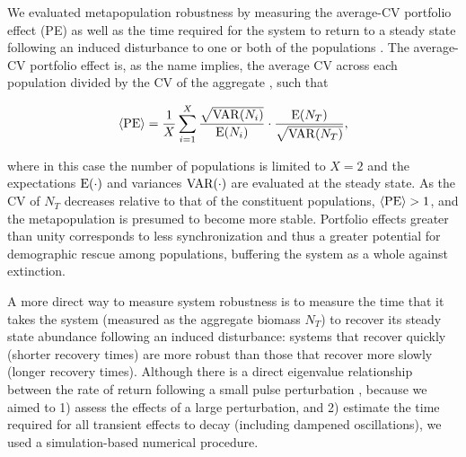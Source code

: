\documentclass[twocolumn,preprintnumbers,amsmath,amssymb,superscriptaddress]{revtex4}
\begin{document}
\noindent We evaluated metapopulation robustness by measuring the average-CV portfolio effect (PE) \cite{Anderson:2014cx,Schindler:2015gf} as well as the time required for the system to return to a steady state following an induced disturbance to one or both of the populations \cite{Ovaskainen:2002il}.
The average-CV portfolio effect is, as the name implies, the average CV across each population divided by the CV of the aggregate \cite{Anderson:2013gb}, such that


\begin{equation}
\langle{\rm PE}\rangle =\frac{1}{X}\sum_{i=1}^{X} \frac{\sqrt{{\rm VAR}(N_i)}}{{\rm E}(N_i)}\cdot \frac{{\rm E}(N_T)}{\sqrt{{\rm VAR}(N_T)}},
\label{eq:pe}
\end{equation}

\noindent where in this case the number of populations is limited to $X=2$ and the expectations $\rm E(\cdot)$ and variances $\rm VAR(\cdot)$ are evaluated at the steady state.
As the CV of $N_T$ decreases relative to that of the constituent populations, $\langle{\rm PE}\rangle > 1$, and the metapopulation is presumed to become more stable.
Portfolio effects greater than unity corresponds to less synchronization  \cite{Loreau:2008ju,Anderson:2014cx,Yeakel:2013vz} and thus a greater potential for demographic rescue among populations, buffering the system as a whole against extinction. 

A more direct way to measure system robustness is to measure the time that it takes the system (measured as the aggregate biomass $N_T$) to recover its steady state abundance following an induced disturbance: systems that recover quickly (shorter recovery times) are more robust than those that recover more slowly (longer recovery times).
Although there is a direct eigenvalue relationship between the rate of return following a small pulse perturbation \cite{GuckHolmes}, because we aimed to 1) assess the effects of a large perturbation, and 2) estimate the time required for all transient effects to decay (including dampened oscillations), we used a simulation-based numerical procedure.
\end{document}
